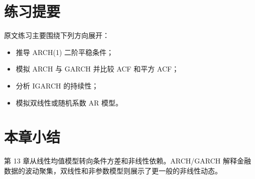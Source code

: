 \documentclass[11pt,a4paper]{ctexart}
\begin{document}
\section{练习提要}

原文练习主要围绕下列方向展开：
\begin{itemize}
  \item 推导 ARCH(1) 二阶平稳条件；
  \item 模拟 ARCH 与 GARCH 并比较 ACF 和平方 ACF；
  \item 分析 IGARCH 的持续性；
  \item 模拟双线性或随机系数 AR 模型。
\end{itemize}

\section*{本章小结}

第 13 章从线性均值模型转向条件方差和非线性依赖。ARCH/GARCH 解释金融数据的波动聚集，双线性和非参数模型则展示了更一般的非线性动态。
\end{document}
